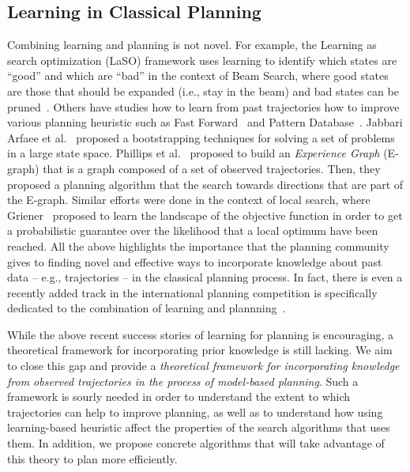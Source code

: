 \documentclass[12pt]{article}
\begin{document}
\subsection{Learning in Classical Planning}
Combining learning and planning is not novel. For example, the Learning as search optimization (LaSO) framework uses learning to identify which states are ``good'' and which are ``bad''
in the context of Beam Search, where good states are those that should be expanded (i.e., stay in the beam) and bad states can be pruned~\cite{xu2007discriminative}. 
Others have studies how to learn from past trajectories how to improve various planning heuristic such as Fast Forward~\cite{yoon2006learning} and Pattern Database~\cite{samadi2008learning}. Jabbari Arfaee et al.~\cite{arfaee2011learning} proposed a bootstrapping techniques for solving a set of problems in a large state space. 
Phillips et al.~\cite{phillips2012graphs} proposed to build an {\em Experience Graph} (E-graph) that is a graph composed of a set of observed trajectories. Then, they proposed a planning algorithm that the search towards directions that are part of the E-graph. 
Similar efforts were done in the context of local search, 
where Griener~\cite{greiner1996palo} proposed to learn
the landscape of the objective function in order to get a probabilistic guarantee over the likelihood that a local optimum have been reached. 
All the above highlights the importance that the planning community gives to  finding novel and effective ways to incorporate knowledge about past data -- e.g., trajectories -- in the classical planning process. In fact, there is even a recently added track in the international planning competition is specifically dedicated to the combination of learning and plannning~\cite{fern2011first}.  




While the above recent success stories of learning for planning is encouraging, a theoretical framework for incorporating prior knowledge is still lacking. We aim to close this gap and provide a {\em theoretical framework for incorporating knowledge from observed trajectories in the process of model-based planning}. Such a framework is sourly needed in order to understand the extent to which trajectories can help to improve planning, as well as to understand how using learning-based heuristic affect the properties of the search algorithms that uses them. In addition, we propose concrete algorithms that will take advantage of this theory to plan more efficiently. 
\end{document}

